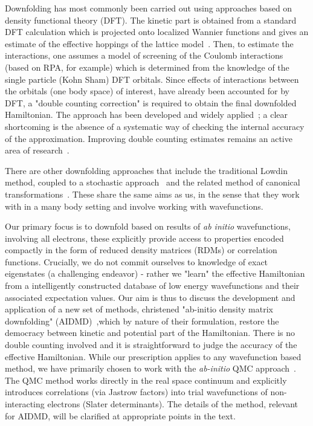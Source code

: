 \documentclass[prl,12pt,onecolumn,nofootinbib,notitlepage,english,superscriptaddress]{revtex4-1}
\begin{document}
Downfolding has most commonly been carried out using approaches based on density functional theory (DFT). 
The kinetic part is obtained from a standard 
DFT calculation which is projected onto localized Wannier functions and 
gives an estimate of the effective hoppings of the lattice model~\cite{Pavirini}. 
Then, to estimate the interactions, one assumes a model of screening of the Coulomb interactions 
(based on RPA, for example) which is determined from the knowledge of the single particle (Kohn Sham) 
DFT orbitals. Since effects of interactions between the orbitals (one body space) of interest, have already 
been accounted for by DFT, a "double counting correction" is required to obtain the final 
downfolded Hamiltonian. The approach has been developed and widely applied~\cite{}; 
a clear shortcoming is the absence of a systematic way of checking 
the internal accuracy of the approximation. Improving double counting estimates remains an active area of 
research~\cite{Haule_doublecounting}.

There are other downfolding approaches that include the traditional Lowdin method, coupled to a stochastic 
approach~\cite{Tenno,Zhou_Ceperley} and the related method of canonical transformations~\cite{White_CT, Yanai_CT}. 
These share the same aims as us, in the sense that they work with 
in a many body setting and involve working with wavefunctions. 

Our primary focus is to downfold based on results of \emph{ab initio} wavefunctions, involving all electrons, 
these explicitly provide access to properties encoded compactly in the form of reduced 
density matrices (RDMs) or correlation functions. Crucially, we do not commit ourselves to 
knowledge of exact eigenstates (a challenging endeavor) - rather we "learn" the effective Hamiltonian from a 
intelligently constructed database of low energy wavefunctions and their associated expectation values. 
Our aim is thus to discuss the development and application of a new set of methods, christened 
"ab-initio density matrix downfolding" (AIDMD)~\cite{Changlani2015},which by nature of their formulation, 
restore the democracy between kinetic and potential part of the Hamiltonian. There is no double counting involved and it is straightforward 
to judge the accuracy of the effective Hamiltonian. While our prescription applies to any wavefunction based method, 
we have primarily chosen to work with the \emph{ab-initio} QMC approach~\cite{Ceperley_Alder,Foulkes_review}. 
The QMC method works directly in the real space continuum and explicitly introduces correlations (via Jastrow factors) 
into trial wavefunctions of non-interacting electrons (Slater determinants). 
The details of the method, relevant for AIDMD, will be clarified at appropriate points 
in the text. 
\end{document}
